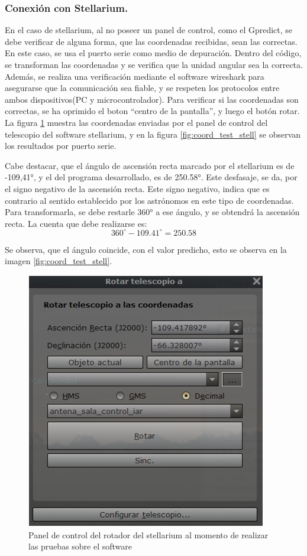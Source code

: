\subsubsection{Conexión con Stellarium.} 

En el caso de stellarium, al no poseer un panel de control, como el Gpredict, se debe verificar de alguna forma, que las coordenadas recibidas, sean las correctas. En este caso, se usa el puerto serie como medio de depuración. Dentro del código, se transforman las coordenadas y se verifica que la unidad angular sea la correcta. Además, se realiza una verificación mediante el software wireshark para asegurarse que la comunicación sea fiable, y se respeten los protocolos entre ambos dispositivos(PC y microcontrolador).
Para verificar si las coordenadas son correctas, se ha oprimido el boton ``centro de la pantalla'', y luego el botón rotar. La figura \ref{fig:rotador_antena_stell_test} muestra las coordenadas enviadas por el panel de control del telescopio del software stellarium, y en la figura \ref{fig:coord_test_stell} se observan los resultados por puerto serie. 

Cabe destacar, que el ángulo de ascensión recta marcado por el stellarium es de -109,41°, y el del programa desarrollado, es de 250.58°. Este desfasaje, se da, por el signo negativo de la ascensión recta. Este signo negativo, indica que es contrario al sentido establecido por los astrónomos en este tipo de coordenadas. Para transformarla, se debe restarle 360° a ese ángulo, y se obtendrá la ascensión recta. La cuenta que debe realizarse es: 
\begin{equation*}
	360^\circ - 109.41^\circ = 250.58 
\end{equation*}

 Se observa, que el ángulo coincide, con el valor predicho, esto se observa en la imagen \ref{fig:coord_test_stell}.  
\begin{figure}[ht!]
	\includegraphics{rotador_antena_stell} 
	\caption{Panel de control del rotador del stellarium al momento de realizar las pruebas sobre el software} 
	\label{fig:rotador_antena_stell_test}
\end{figure}

